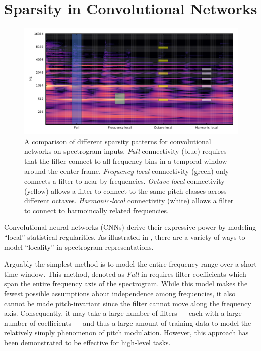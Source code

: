 \documentclass{article}
\begin{document}
\section{Sparsity in Convolutional Networks}\label{sec:page_size}


\begin{figure}
    \includegraphics[width=\columnwidth]{figs/filter-shapes}
    \caption{A comparison of different sparsity patterns for convolutional networks on spectrogram inputs.
        \emph{Full} connectivity (blue) requires that the filter connect to all frequency bins in a temporal window around the center frame.
        \emph{Frequency-local} connectivity (green) only connects a filter to near-by frequencies.
        \emph{Octave-local} connectivity (yellow) allows a filter to connect to the same pitch classes across different octaves.
        \emph{Harmonic-local} connectivity (white) allows a filter to connect to harmoincally related frequencies.}
\label{figs:filter-shapes}
\end{figure}
Convolutional neural networks (CNNs) derive their expressive power by modeling ``local'' statistical regularities.
As illustrated in , there are a variety of ways to model ``locality'' in spectrogram representations.

Arguably the simplest method is to model the entire frequency range over a short time window.  
This method, denoted as \emph{Full} in  requires filter coefficients which span the entire frequency axis of the spectrogram.
While this model makes the fewest possible assumptions about independence among frequencies, it also cannot be made pitch-invariant since the filter cannot move along the frequency axis.
Consequently, it may take a large number of filters --- each with a large number of coefficients --- and thus a large amount of training data to model the relatively simply phenomenon of pitch modulation.
However, this approach has been demonstrated to be effective for high-level tasks. %
\end{document}
